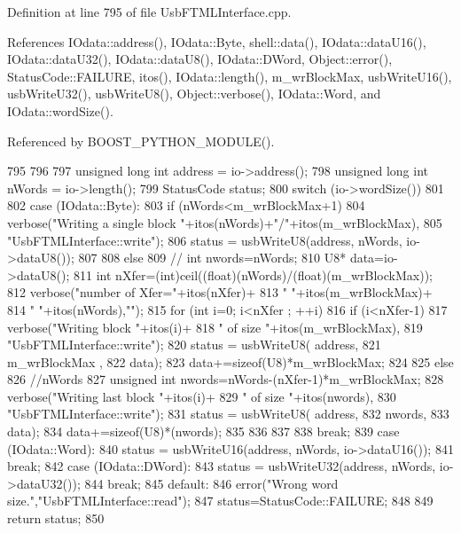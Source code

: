 Definition at line 795 of file UsbFTMLInterface.cpp.

References IOdata::address(), IOdata::Byte, shell::data(), IOdata::dataU16(), IOdata::dataU32(), IOdata::dataU8(), IOdata::DWord, Object::error(), StatusCode::FAILURE, itos(), IOdata::length(), m\_\-wrBlockMax, usbWriteU16(), usbWriteU32(), usbWriteU8(), Object::verbose(), IOdata::Word, and IOdata::wordSize().

Referenced by BOOST\_\-PYTHON\_\-MODULE().


\begin{DoxyCode}
795                                             {
796 
797   unsigned long int address = io->address();
798   unsigned long int nWords  = io->length();
799   StatusCode status;
800   switch (io->wordSize())
801   {
802   case (IOdata::Byte):
803     if (nWords<m_wrBlockMax+1){
804       verbose("Writing a single block "+itos(nWords)+"/"+itos(m_wrBlockMax),
805               "UsbFTMLInterface::write");
806       status = usbWriteU8(address, nWords, io->dataU8());
807     }
808     else {
809       //      int nwords=nWords;
810       U8* data=io->dataU8();
811       int nXfer=(int)ceil((float)(nWords)/(float)(m_wrBlockMax));
812       verbose("number of Xfer="+itos(nXfer)+
813               " "+itos(m_wrBlockMax)+
814               " "+itos(nWords),"");
815       for (int i=0; i<nXfer ; ++i){
816         if (i<nXfer-1){
817           verbose("Writing block "+itos(i)+
818                   " of size "+itos(m_wrBlockMax),
819                   "UsbFTMLInterface::write");
820           status = usbWriteU8( address, 
821                                m_wrBlockMax , 
822                                data);
823           data+=sizeof(U8)*m_wrBlockMax;
824         }
825         else {
826           //nWords%
827           unsigned int nwords=nWords-(nXfer-1)*m_wrBlockMax;
828           verbose("Writing last block "+itos(i)+
829                   " of size "+itos(nwords),
830                   "UsbFTMLInterface::write");
831           status = usbWriteU8( address, 
832                                nwords, 
833                                data); 
834           data+=sizeof(U8)*(nwords);
835         }
836       }
837     }
838     break;
839   case (IOdata::Word):
840     status = usbWriteU16(address, nWords, io->dataU16());
841     break;
842   case (IOdata::DWord):
843     status = usbWriteU32(address, nWords, io->dataU32());
844     break;
845   default:
846     error("Wrong word size.","UsbFTMLInterface::read");
847     status=StatusCode::FAILURE;
848   }
849   return status;
850 }
\end{DoxyCode}


